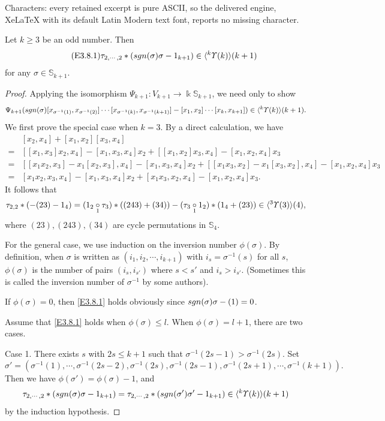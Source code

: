 \documentclass[10pt,a4paper]{amsart}
\def\S{\mathbb{S}}
\def\sgn{{\rm sgn}}
\newcommand{\lr}[1]{\langle #1 \rangle}
\newcommand{\ucr}[1]{\underset{#1}{\circ}}
\newcommand{\up}[1]{{^{#1}{\it \!\Upsilon}}}
\begin{document}
Characters: every retained excerpt is pure ASCII, so the delivered engine, XeLaTeX with its default Latin Modern text font, reports no missing character.
\begin{lem}
\label{yylem3.8}
Let $k\geq 3$ be an odd number. Then 
\begin{align}
\label{E3.8.1}\tag{E3.8.1}
\tau_{2, \cdots, 2}\ast (\sgn(\sigma)\sigma-1_{k+1})
\in \lr{\up{k}(k)}(k+1)
\end{align}
for any $\sigma\in \S_{k+1}$. 
\end{lem}

\begin{proof}
Applying the isomorphism 
$\Psi_{k+1}\colon V_{k+1}\to \Bbbk\S_{k+1}$, we need only 
to show
\[\Psi_{k+1}(\sgn(\sigma)[x_{\sigma^{-1}(1)}, x_{\sigma^{-1}(2)}]
\cdots [x_{\sigma^{-1}(k)}, x_{\sigma^{-1}(k+1)}]
-[x_1, x_2]\cdots[x_{k}, x_{k+1}])\in \lr{\up{k}(k)}(k+1).\]
We first prove the special case when $k=3$. By a direct calculation, 
we have
\begin{align*}
[x_1, x_3]&[x_2, x_4]+[x_1, x_2][x_3, x_4]\\
=& [[x_1, x_3]x_2, x_4]-[x_1, x_3, x_4]x_2
 +[[x_1, x_2]x_3, x_4]-[x_1, x_2, x_4]x_3\\
=& [[x_1x_2, x_3]-x_1[x_2, x_3], x_4]
 -[x_1, x_3, x_4]x_2+[[x_1x_3, x_2]-x_1[x_3, x_2], x_4]
 -[x_1, x_2, x_4]x_3\\
=& [x_1x_2, x_3, x_4]-[x_1, x_3, x_4]x_2
 +[x_1x_3, x_2, x_4]-[x_1, x_2, x_4]x_3.
\end{align*}
It follows that 
\[\tau_{2, 2}\ast (-(23)-1_{4})
=(1_2\ucr{1}\tau_3)\ast((243)+(34))
-(\tau_3\ucr{1}1_2)\ast(1_{4}+(23))\in \lr{\up{3}(3)}(4),\]
where $(23), (243), (34)$ are cycle permutations in 
$\S_{4}$. 

For the general case, we use induction on the inversion 
number $\phi(\sigma)$. By definition, when $\sigma$ is 
written as $(i_1, i_2, \cdots, i_{k+1})$ with 
$i_s=\sigma^{-1}(s)$ for all $s$, $\phi(\sigma)$ is the 
number of pairs $(i_{s},i_{s'})$ where $s<s'$ and $i_s>i_{s'}$. 
(Sometimes this is called the inversion number of 
$\sigma^{-1}$ by some authors).

If $\phi(\sigma)=0$, then \eqref{E3.8.1} holds obviously 
since $\sgn(\sigma)\sigma-(1)=0$.

Assume that \eqref{E3.8.1} holds when $\phi(\sigma)\le l$. 
When $\phi(\sigma)=l+1$, there are two cases. 

Case 1. There exists $s$ with $2s\le k+1$ such that 
$\sigma^{-1}(2s-1)>\sigma^{-1}(2s)$. 
Set \[\sigma'=(\sigma^{-1}(1), \cdots, \sigma^{-1}(2s-2), 
\sigma^{-1}(2s), \sigma^{-1}(2s-1),
\sigma^{-1}(2s+1), \cdots, \sigma^{-1}(k+1)).\] 
Then we have 
$\phi(\sigma')=\phi(\sigma)-1$, and 
\begin{align*}
 \tau_{2, \cdots, 2}\ast (\sgn(\sigma)\sigma-1_{k+1})
=\tau_{2, \cdots, 2}\ast (\sgn(\sigma')\sigma'-1_{k+1})
\in \lr{\up{k}(k)}(k+1)
\end{align*}
by the induction hypothesis.


\end{proof}
\end{document}
